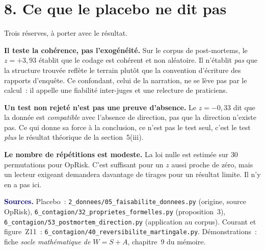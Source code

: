 \documentclass[11pt,a4paper]{article}
\begin{document}
\section*{8. Ce que le placebo ne dit pas}

Trois réserves, à porter avec le résultat.

\textbf{Il teste la cohérence, pas l'exogénéité.} Sur le corpus de post-mortems, le
$z=+3{,}93$ établit que le codage est cohérent et non aléatoire. Il n'établit \emph{pas}
que la structure trouvée reflète le terrain plutôt que la convention d'écriture des
rapports d'enquête. Ce confondant, celui de la narration, ne se lève pas par le calcul~:
il appelle une fiabilité inter-juges et une relecture de praticiens.

\textbf{Un test non rejeté n'est pas une preuve d'absence.} Le $z=-0{,}33$ dit que la
donnée est \emph{compatible} avec l'absence de direction, pas que la direction n'existe
pas. Ce qui donne sa force à la conclusion, ce n'est pas le test seul, c'est le test
\emph{plus} le résultat théorique de la section~5(iii).

\textbf{Le nombre de répétitions est modeste.} La loi nulle est estimée sur $30$
permutations pour OpRisk. C'est suffisant pour un $z$ aussi proche de zéro, mais un lecteur
exigeant demandera davantage de tirages pour un résultat limite. Il n'y en a pas ici.

\smallskip
\sloppy
\noindent\footnotesize\textcolor{navy}{\textbf{Sources.}} Placebo~:
\texttt{2\_donnees/05\_faisabilite\_donnees.py} (origine, source OpRisk),
\texttt{6\_contagion/32\_proprietes\_formelles.py} (proposition~3),
\texttt{6\_contagion/53\_postmortem\_direction.py} (application au corpus). Courant et
figure~Z11~: \texttt{6\_contagion/40\_reversibilite\_martingale.py}. Démonstrations~: fiche
\emph{socle mathématique de $W=S+A$}, chapitre~9 du mémoire.
\end{document}
